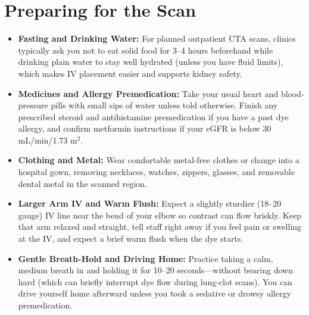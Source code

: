 \section{Preparing for the Scan}
\begin{itemize}
    \item \textbf{Fasting and Drinking Water:} For planned outpatient CTA scans, clinics typically ask you not to eat solid food for 3--4 hours beforehand while drinking plain water to stay well hydrated (unless you have fluid limits), which makes IV placement easier and supports kidney safety.
    \item \textbf{Medicines and Allergy Premedication:} Take your usual heart and blood-pressure pills with small sips of water unless told otherwise. Finish any prescribed steroid and antihistamine premedication if you have a past dye allergy, and confirm metformin instructions if your eGFR is below 30 mL/min/1.73 m$^2$.
    \item \textbf{Clothing and Metal:} Wear comfortable metal-free clothes or change into a hospital gown, removing necklaces, watches, zippers, glasses, and removable dental metal in the scanned region.
    \item \textbf{Larger Arm IV and Warm Flush:} Expect a slightly sturdier (18--20 gauge) IV line near the bend of your elbow so contrast can flow briskly. Keep that arm relaxed and straight, tell staff right away if you feel pain or swelling at the IV, and expect a brief warm flush when the dye starts.
    \item \textbf{Gentle Breath-Hold and Driving Home:} Practice taking a calm, medium breath in and holding it for 10--20 seconds---without bearing down hard (which can briefly interrupt dye flow during lung-clot scans). You can drive yourself home afterward unless you took a sedative or drowsy allergy premedication.
\end{itemize}

